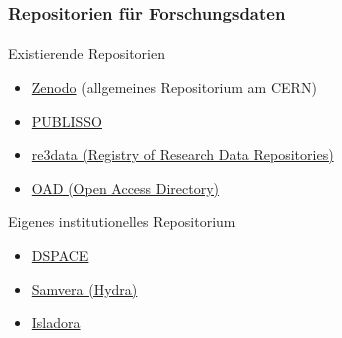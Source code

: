 \begin{frame}
    \frametitle{Repositorien für Forschungsdaten}
    \framesubtitle{}

    \begin{block}{Existierende Repositorien}

        \begin{itemize}
            \item [\ExternalLink] \href{https://zenodo.org/}{Zenodo} (allgemeines Repositorium am CERN)
                \newline
            \item [\ExternalLink] \href{http://www.publisso.de/open-access-publizieren/forschungsdaten/forschungsdatenrepositorien/}{PUBLISSO} 
            \item [\ExternalLink] \href{http://www.re3data.org/}{re3data (Registry of Research Data Repositories)} 
            \item [\ExternalLink] \href{http://oad.simmons.edu/oadwiki/Data_repositories}{OAD (Open Access Directory)} 
        \end{itemize}
    \end{block}


    \begin{block}{Eigenes institutionelles Repositorium}
        \begin{itemize}
            \item [\ExternalLink] \href{http://www.dspace.org/}{DSPACE}
            \item [\ExternalLink] \href{https://wiki.duraspace.org/display/hydra/The+Hydra+Project#space-menu-link-content}{Samvera (Hydra)}
            \item [\ExternalLink] \href{http://islandora.ca/}{Isladora}
        \end{itemize}


    \end{block}
\end{frame}
